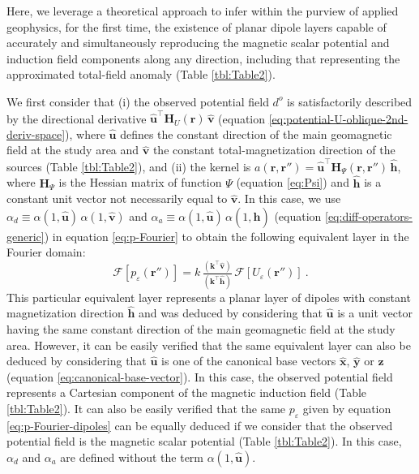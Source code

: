 \documentclass[manuscript,noblind]{geophysics}
\begin{document}
	Here, we leverage a theoretical approach to infer within the purview of applied geophysics, 
	for the first time, the existence of planar dipole layers capable of accurately and simultaneously reproducing 
	the magnetic scalar potential and induction field components along any direction, including that representing 
	the approximated total-field anomaly (Table \ref{tbl:Table2}).
	
	We first consider that (i) the observed potential field $d^{o}$ 
	is satisfactorily described by the directional derivative $\hat{\mathbf{u}}^{\top} \mathbf{H}_{U}(\mathbf{r}) \, \hat{\mathbf{v}}$ 
	(equation \ref{eq:potential-U-oblique-2nd-deriv-space}), where $\hat{\mathbf{u}}$ defines the constant direction of the main geomagnetic
	field at the study area and $\hat{\mathbf{v}}$ the constant total-magnetization direction of the sources  (Table \ref{tbl:Table2}), and (ii)
	the kernel is $a(\mathbf{r}, \mathbf{r}'') = \hat{\mathbf{u}}^{\top} \mathbf{H}_{\Psi}(\mathbf{r}, \mathbf{r}'') \, \hat{\mathbf{h}}$,
	where $\mathbf{H}_{\Psi}$ is the Hessian matrix \citep[e.g.,][ p. 158]{kaplan2002} of
	function $\Psi$ (equation \ref{eq:Psi}) and $\hat{\mathbf{h}}$ is a constant unit vector not necessarily equal to 
	$\hat{\mathbf{v}}$.
	In this case, we use $\alpha_{d} \equiv \alpha(1, \hat{\mathbf{u}}) \, \alpha(1, \hat{\mathbf{v}})$ and 
	$\alpha_{a} \equiv \alpha(1, \hat{\mathbf{u}}) \, \alpha(1, \hat{\mathbf{h}})$ 
	(equation \ref{eq:diff-operators-generic}) in equation \ref{eq:p-Fourier} to obtain the following equivalent layer 
	in the Fourier domain:
	\begin{equation}
		\mathcal{F} [ p_{\varepsilon}(\mathbf{r}'') ] =
		k \, \tfrac{\left(\mathbf{k}^{\top} \hat{\mathbf{v}} \right)}{\left(\mathbf{k}^{\top} \hat{\mathbf{h}} \right)} \,
		\mathcal{F} \left[ U_{\varepsilon}(\mathbf{r}'') \right] \: .
		\label{eq:p-Fourier-dipoles}
	\end{equation}
	This particular equivalent layer represents a planar layer of dipoles with constant magnetization direction
	$\hat{\mathbf{h}}$ and was deduced by considering
	that $\hat{\mathbf{u}}$ is a unit vector having the same constant direction of the main geomagnetic field at the study area.
	However, it can be easily verified that the same equivalent layer can also be deduced by considering that $\hat{\mathbf{u}}$ is one of the
	canonical base vectors $\hat{\mathbf{x}}$, $\hat{\mathbf{y}}$ or $\hat{\mathbf{z}}$ (equation \ref{eq:canonical-base-vector}).
	In this case, the observed potential field represents a Cartesian component of the magnetic induction field  (Table \ref{tbl:Table2}).
	It can also be easily verified that the same $p_{\varepsilon}$ given by equation 
	\ref{eq:p-Fourier-dipoles} can be equally deduced if we consider that the 
	observed potential field is the magnetic scalar potential  (Table \ref{tbl:Table2}). 
	In this case, $\alpha_{d}$ and $\alpha_{a}$ are defined
	without the term $\alpha(1, \hat{\mathbf{u}})$. 
	
\end{document}

